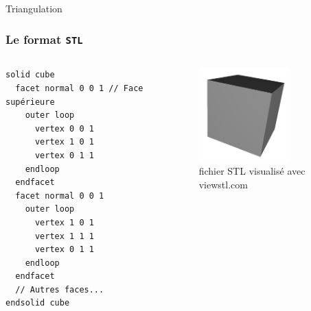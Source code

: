 \begin{frame}{Triangulation}
\begin{center}
\begin{minipage}{0.45\textwidth}
\end{minipage}
\end{center}
\end{frame}

\begin{frame}[fragile]
  \frametitle{Le format \texttt{STL}}

  \begin{columns}
    \scriptsize
\begin{verbatim}
solid cube
  facet normal 0 0 1 // Face supérieure
    outer loop
      vertex 0 0 1
      vertex 1 0 1
      vertex 0 1 1
    endloop
  endfacet
  facet normal 0 0 1
    outer loop
      vertex 1 0 1
      vertex 1 1 1
      vertex 0 1 1
    endloop
  endfacet
  // Autres faces...
endsolid cube
\end{verbatim}
    \begin{figure}
      \centering
      \includegraphics[width=3.5cm]{capture/cubestl.png} %
      \caption{\tiny fichier STL visualisé avec viewstl.com}
    \end{figure}
  \end{columns}
\end{frame}
